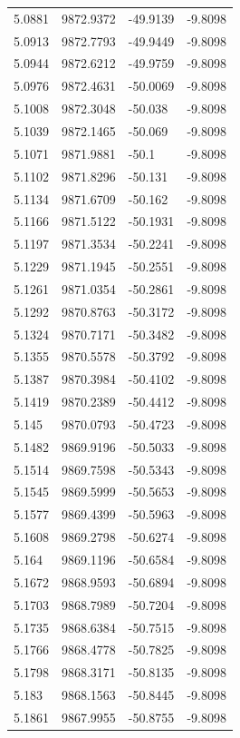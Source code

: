 \begin{table}[H]
\begin{tabular}{llll}
5.0881 & 9872.9372 & -49.9139 & -9.8098 \\
5.0913 & 9872.7793 & -49.9449 & -9.8098 \\
5.0944 & 9872.6212 & -49.9759 & -9.8098 \\
5.0976 & 9872.4631 & -50.0069 & -9.8098 \\
5.1008 & 9872.3048 & -50.038 & -9.8098 \\
5.1039 & 9872.1465 & -50.069 & -9.8098 \\
5.1071 & 9871.9881 & -50.1 & -9.8098 \\
5.1102 & 9871.8296 & -50.131 & -9.8098 \\
5.1134 & 9871.6709 & -50.162 & -9.8098 \\
5.1166 & 9871.5122 & -50.1931 & -9.8098 \\
5.1197 & 9871.3534 & -50.2241 & -9.8098 \\
5.1229 & 9871.1945 & -50.2551 & -9.8098 \\
5.1261 & 9871.0354 & -50.2861 & -9.8098 \\
5.1292 & 9870.8763 & -50.3172 & -9.8098 \\
5.1324 & 9870.7171 & -50.3482 & -9.8098 \\
5.1355 & 9870.5578 & -50.3792 & -9.8098 \\
5.1387 & 9870.3984 & -50.4102 & -9.8098 \\
5.1419 & 9870.2389 & -50.4412 & -9.8098 \\
5.145 & 9870.0793 & -50.4723 & -9.8098 \\
5.1482 & 9869.9196 & -50.5033 & -9.8098 \\
5.1514 & 9869.7598 & -50.5343 & -9.8098 \\
5.1545 & 9869.5999 & -50.5653 & -9.8098 \\
5.1577 & 9869.4399 & -50.5963 & -9.8098 \\
5.1608 & 9869.2798 & -50.6274 & -9.8098 \\
5.164 & 9869.1196 & -50.6584 & -9.8098 \\
5.1672 & 9868.9593 & -50.6894 & -9.8098 \\
5.1703 & 9868.7989 & -50.7204 & -9.8098 \\
5.1735 & 9868.6384 & -50.7515 & -9.8098 \\
5.1766 & 9868.4778 & -50.7825 & -9.8098 \\
5.1798 & 9868.3171 & -50.8135 & -9.8098 \\
5.183 & 9868.1563 & -50.8445 & -9.8098 \\
5.1861 & 9867.9955 & -50.8755 & -9.8098 \\

\end{tabular}
\end{table}
